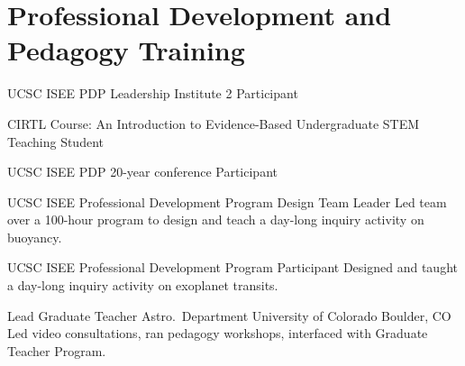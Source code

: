 \section{Professional Development and Pedagogy Training}


        {UCSC ISEE PDP Leadership Institute 2}
        {Participant}
        {}{}{}

        {CIRTL Course: An Introduction to Evidence-Based Undergraduate STEM Teaching}
        {Student}
        {}{}{}

\cventry{}
        {UCSC ISEE PDP 20-year conference}
        {Participant}
        {}{}{}

		{UCSC ISEE Professional Development Program}
		{Design Team Leader}
		{}
		{}
		{Led team over a 100-hour program to design and teach a day-long inquiry activity on buoyancy.}

		{UCSC ISEE Professional Development Program}
		{Participant}
		{}
		{}
		{Designed and taught a day-long inquiry activity on exoplanet transits.}

		{Lead Graduate Teacher}
		{Astro.~Department}
		{University of Colorado}
		{Boulder, CO}
		{Led video consultations, ran pedagogy workshops, interfaced with Graduate Teacher Program.}


